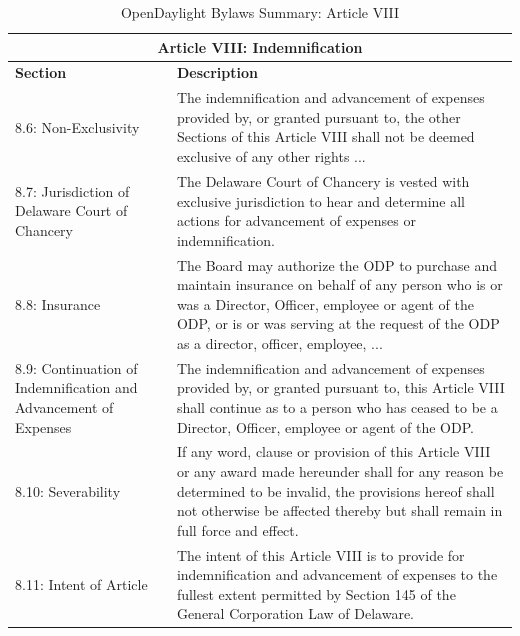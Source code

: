 \documentclass[a4paper, 12pt]{book}
\begin{document}
\begin{table}[H]
  \begin{center}
    \begin{tabular}{ | p{4cm} | p{11cm} | }
    \toprule
    \multicolumn {2}{|c|}{\textbf{Article VIII: Indemnification}} \\
    \hline
    \textbf{Section} & \textbf{Description} \\
    \hline
    8.6: Non-Exclusivity & The indemnification and advancement of expenses provided by, or granted pursuant to, the other Sections of this Article VIII shall not be deemed exclusive of any other rights ...\\
    \hline
    8.7: Jurisdiction of Delaware Court of Chancery & The Delaware Court of Chancery is vested with exclusive jurisdiction to hear and determine all actions for advancement of expenses or indemnification.\\
    \hline
    8.8: Insurance & The Board may authorize the ODP to purchase and maintain insurance on behalf of any person who is or was a Director, Officer, employee or agent of the ODP, or is or was serving at the request of the ODP as a director, officer, employee, ...\\
    \hline
    8.9: Continuation of Indemnification and Advancement of Expenses & The indemnification and advancement of expenses provided by, or granted pursuant to, this Article VIII shall continue as to a person who has ceased to be a Director, Officer, employee or agent of the ODP.\\
    \hline
    8.10: Severability & If any word, clause or provision of this Article VIII or any award made hereunder shall for any reason be determined to be invalid, the provisions hereof shall not otherwise be affected thereby but shall remain in full force and effect.\\
    \hline
    8.11: Intent of Article & The intent of this Article VIII is to provide for indemnification and advancement of expenses to the fullest extent permitted by Section 145 of the General Corporation Law of Delaware.\\
    \bottomrule
    \end{tabular}
    \caption{OpenDaylight Bylaws Summary: Article VIII}
    \label{tab:odlbylaws-art08}
  \end{center}
\end{table}
\end{document}
